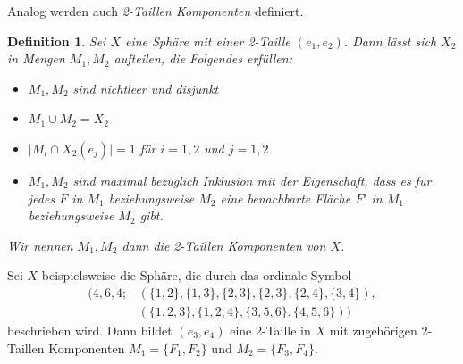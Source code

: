 \documentclass[12pt,titlepage,twoside,cleardoublepage]{article}
\theoremstyle{nummermitklammern}
\newtheorem{definition}[temp]{Definition}
\newtheorem{definition}[zahl]{Definition}
\numberwithin{equation}{section}
\begin{document}
Analog werden auch \emph{2-Taillen Komponenten} definiert.
\begin{definition}
Sei $X$ eine Sphäre mit einer 2-Taille $(e_1,e_2)$. Dann lässt sich $X_2$ in  Mengen $M_1,M_2$ aufteilen, die Folgendes erfüllen:
\begin{itemize}
\item $M_1,M_2$ sind nichtleer und disjunkt
\item $M_1\cup M_2=X_2$
\item $\vert M_i \cap X_2(e_j)\vert =1$ für $i=1,2$ und $j=1,2$
\item $M_1,M_2$ sind maximal bezüglich Inklusion mit der Eigenschaft, dass es für jedes $F$ in $M_1$ beziehungsweise $M_2$ eine benachbarte Fläche $F'$ in $M_1$ beziehungsweise $M_2$ gibt.
\end{itemize}  
 Wir nennen $M_1,M_2$ dann die \emph{2-Taillen Komponenten} von $X$. 
\end{definition}
Sei $X$ beispielsweise die Sphäre, die durch das ordinale Symbol
\begin{align*}
(4,6,4;&(\{1,2\},\{1,3\},\{2,3\},\{2,3\},\{2,4\},\{3,4\}),\\&(\{1,2,3\},\{1,2,4\},\{3,5,6\},\{4,5,6\}))
\end{align*}
beschrieben wird. Dann bildet $(e_3,e_4)$ eine 2-Taille in $X$ mit zugehörigen 2-Taillen Komponenten $M_1=\{F_1,F_2\}$ und $M_2=\{F_3,F_4\}.$

\end{document}
